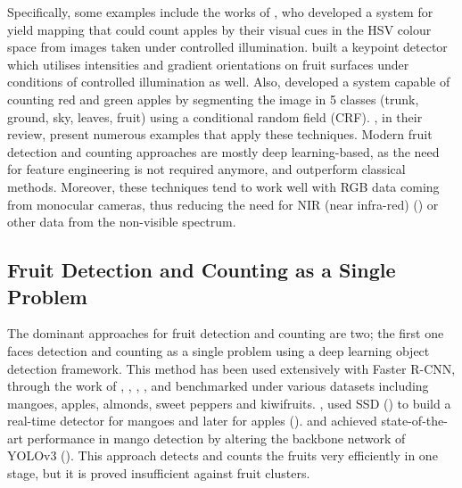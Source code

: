 Specifically, some examples include the works of \cite{wang2013automated}, who developed a system for yield mapping that could count apples by their visual cues in the HSV colour space from images taken under controlled illumination. \cite{pothen2016texture} built a keypoint detector which utilises intensities and gradient orientations on fruit surfaces under conditions of controlled illumination as well. Also, \cite{hung2015feature} developed a system capable of counting red and green apples by segmenting the image in 5 classes (trunk, ground, sky, leaves, fruit) using a conditional random field (CRF). \cite{gongal2015sensors}, in their review, present numerous examples that apply these techniques. Modern fruit detection and counting approaches are mostly deep learning-based, as the need for feature engineering is not required anymore, and outperform classical methods. Moreover, these techniques tend to work well with RGB data coming from monocular cameras, thus reducing the need for NIR (near infra-red) (\cite{hung2013orchard}) or other data from the non-visible spectrum.

\subsection{Fruit Detection and Counting as a Single Problem}
The dominant approaches for fruit detection and counting are two; the first one faces detection and counting as a single problem using a deep learning object detection framework. This method has been used extensively with Faster R-CNN, through the work of \cite{bargoti2017deep}, \cite{sa2016deepfruits}, \cite{mai2018faster}, \cite{fu2018kiwifruit}, \cite{gene2019multi} and benchmarked under various datasets including mangoes, apples, almonds, sweet peppers and kiwifruits. \cite{liang2018real}, used SSD (\cite{liu2016ssd}) to build a real-time detector for mangoes and later for apples (\cite{liang2018apple}). \cite{tian2019apple} and \cite{koirala2019deep} achieved state-of-the-art performance in mango detection by altering the backbone network of YOLOv3 (\cite{redmon2018yolov3}). This approach detects and counts the fruits very efficiently in one stage, but it is proved insufficient against fruit clusters. 

